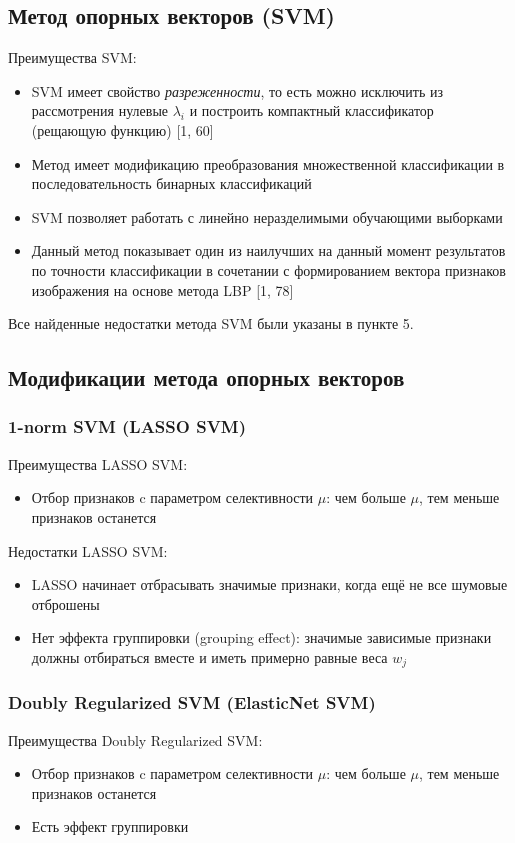 \documentclass[12pt,a4paper]{article}
\begin{document}
\subsection{Метод опорных векторов (SVM)}
Преимущества SVM:
\begin{itemize}
    \item SVM имеет свойство \textit{разреженности}, то есть можно исключить из рассмотрения нулевые $\lambda_i$ и построить компактный классификатор (рещающую функцию) [1, 60]
    \item Метод имеет модификацию преобразования множественной классификации в последовательность бинарных классификаций
    \item SVM позволяет работать с линейно неразделимыми обучающими выборками
    \item Данный метод показывает один из наилучших на данный момент результатов по точности классификации в сочетании с формированием вектора признаков изображения на основе метода LBP [1, 78]
\end{itemize}

Все найденные недостатки метода SVM были указаны в пункте 5.

\subsection{Модификации метода опорных векторов}

\subsubsection{1-norm SVM (LASSO SVM)}
Преимущества LASSO SVM:
\begin{itemize}
	\item  Отбор признаков c параметром селективности $\mu$:
	чем больше $\mu$, тем меньше признаков останется	
\end{itemize}

Недостатки LASSO SVM:
\begin{itemize}
	\item  LASSO начинает отбрасывать значимые признаки,
	когда ещё не все шумовые отброшены
	\item  Нет эффекта группировки (grouping effect):
	значимые зависимые признаки должны отбираться вместе
	и иметь примерно равные веса $w_j$
\end{itemize}

\subsubsection{Doubly Regularized SVM (ElasticNet SVM)}
Преимущества Doubly Regularized SVM:
\begin{itemize}
	\item  Отбор признаков c параметром селективности $\mu$:
	чем больше $\mu$, тем меньше признаков останется
	\item  Есть эффект группировки
\end{itemize}
\end{document}
